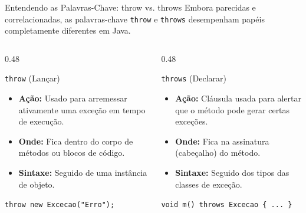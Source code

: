 \documentclass[9pt]{beamer}
\begin{document}
\begin{frame}{Entendendo as Palavras-Chave: throw vs. throws}
    Embora parecidas e correlacionadas, as palavras-chave \texttt{throw} e \texttt{throws} desempenham papéis completamente diferentes em Java.
    
    \vspace{0.3cm}
    
    \begin{columns}[t]
        \begin{column}{0.48\textwidth}
            \begin{block}{\texttt{throw} (Lançar)}
                \small
                \begin{itemize}
                    \item \textbf{Ação:} Usado para arremessar ativamente uma exceção em tempo de execução.
                    \item \textbf{Onde:} Fica dentro do corpo de métodos ou blocos de código.
                    \item \textbf{Sintaxe:} Seguido de uma instância de objeto.
                \end{itemize}
                \vspace{0.1cm}
                \centering\scriptsize
                \texttt{throw new Excecao("Erro");}
            \end{block}
        \end{column}
        
        \begin{column}{0.48\textwidth}
            \begin{block}{\texttt{throws} (Declarar)}
                \small
                \begin{itemize}
                    \item \textbf{Ação:} Cláusula usada para alertar que o método pode gerar certas exceções.
                    \item \textbf{Onde:} Fica na assinatura (cabeçalho) do método.
                    \item \textbf{Sintaxe:} Seguido dos tipos das classes de exceção.
                \end{itemize}
                \vspace{0.1cm}
                \centering\scriptsize
                \texttt{void m() throws Excecao \{ ... \}}
            \end{block}
        \end{column}
    \end{columns}
\end{frame}
\end{document}
